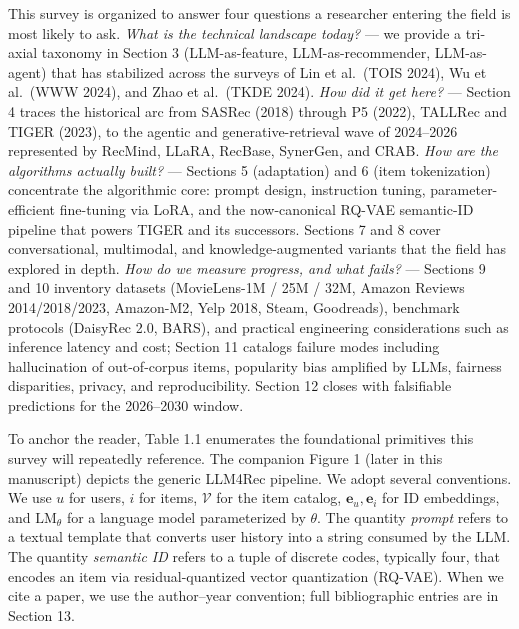 \documentclass{article}
\begin{document}
This survey is organized to answer four questions a researcher entering the field is most likely to ask. \emph{What is the technical landscape today?} --- we provide a tri-axial taxonomy in Section 3 (LLM-as-feature, LLM-as-recommender, LLM-as-agent) that has stabilized across the surveys of Lin et al.~(TOIS 2024), Wu et al.~(WWW 2024), and Zhao et al.~(TKDE 2024). \emph{How did it get here?} --- Section 4 traces the historical arc from SASRec (2018) through P5 (2022), TALLRec and TIGER (2023), to the agentic and generative-retrieval wave of 2024--2026 represented by RecMind, LLaRA, RecBase, SynerGen, and CRAB. \emph{How are the algorithms actually built?} --- Sections 5 (adaptation) and 6 (item tokenization) concentrate the algorithmic core: prompt design, instruction tuning, parameter-efficient fine-tuning via LoRA, and the now-canonical RQ-VAE semantic-ID pipeline that powers TIGER and its successors. Sections 7 and 8 cover conversational, multimodal, and knowledge-augmented variants that the field has explored in depth. \emph{How do we measure progress, and what fails?} --- Sections 9 and 10 inventory datasets (MovieLens-1M / 25M / 32M, Amazon Reviews 2014/2018/2023, Amazon-M2, Yelp 2018, Steam, Goodreads), benchmark protocols (DaisyRec 2.0, BARS), and practical engineering considerations such as inference latency and cost; Section 11 catalogs failure modes including hallucination of out-of-corpus items, popularity bias amplified by LLMs, fairness disparities, privacy, and reproducibility. Section 12 closes with falsifiable predictions for the 2026--2030 window.

To anchor the reader, Table 1.1 enumerates the foundational primitives this survey will repeatedly reference. The companion Figure 1 (later in this manuscript) depicts the generic LLM4Rec pipeline. We adopt several conventions. We use \(u\) for users, \(i\) for items, \(\mathcal{V}\) for the item catalog, \(\mathbf{e}_u, \mathbf{e}_i\) for ID embeddings, and \(\text{LM}_\theta\) for a language model parameterized by \(\theta\). The quantity \emph{prompt} refers to a textual template that converts user history into a string consumed by the LLM. The quantity \emph{semantic ID} refers to a tuple of discrete codes, typically four, that encodes an item via residual-quantized vector quantization (RQ-VAE). When we cite a paper, we use the author--year convention; full bibliographic entries are in Section 13.
\end{document}
